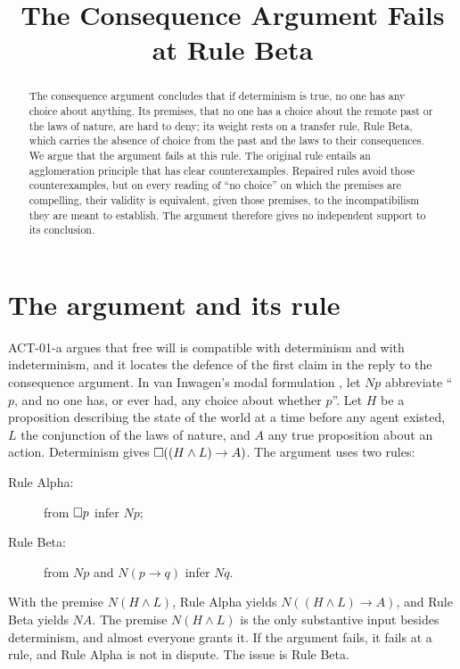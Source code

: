 \documentclass{situationist-preprint}
\title{The Consequence Argument Fails at Rule Beta}
\begin{document}
\maketitle

\begin{abstract}
The consequence argument concludes that if determinism is true, no one has any choice about anything. Its premises, that no one has a choice about the remote past or the laws of nature, are hard to deny; its weight rests on a transfer rule, Rule Beta, which carries the absence of choice from the past and the laws to their consequences. We argue that the argument fails at this rule. The original rule entails an agglomeration principle that has clear counterexamples. Repaired rules avoid those counterexamples, but on every reading of \enquote{no choice} on which the premises are compelling, their validity is equivalent, given those premises, to the incompatibilism they are meant to establish. The argument therefore gives no independent support to its conclusion.
\end{abstract}

\section{The argument and its rule}

ACT-01-a argues that free will is compatible with determinism and with indeterminism, and it locates the defence of the first claim in the reply to the consequence argument. In van Inwagen's modal formulation \citep{vanInwagen1983}, let $Np$ abbreviate \enquote{$p$, and no one has, or ever had, any choice about whether $p$}. Let $H$ be a proposition describing the state of the world at a time before any agent existed, $L$ the conjunction of the laws of nature, and $A$ any true proposition about an action. Determinism gives $\mathord{\Box}((H \wedge L) \to A)$. The argument uses two rules:
\begin{description}
\item[Rule Alpha:] from $\mathord{\Box} p$ infer $Np$;
\item[Rule Beta:] from $Np$ and $N(p \to q)$ infer $Nq$.
\end{description}
With the premise $N(H \wedge L)$, Rule Alpha yields $N((H \wedge L) \to A)$, and Rule Beta yields $NA$. The premise $N(H \wedge L)$ is the only substantive input besides determinism, and almost everyone grants it. If the argument fails, it fails at a rule, and Rule Alpha is not in dispute. The issue is Rule Beta.
\end{document}
